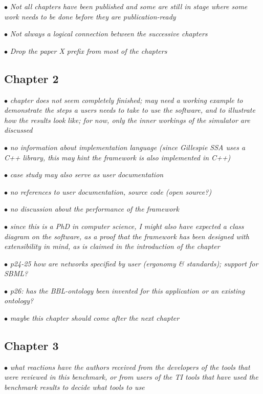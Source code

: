 \documentclass[10pt]{article}
\newcommand{\exam}[2][\  ]{\hspace{0pt}\marginpar{\color{red}#1}$\bullet$ \textit{#2}}
\newcommand{\imp}[1]{{\color{red} #1}}
\newcommand{\bigexclaim}{\raisebox{-0.1em}{\BigTriangleUp}\hspace{-0.32em}\llap{\small\textbf{!}}\hspace{0.32em}}
\newcommand{\tagimp}{\bigexclaim}
\newcommand{\tagtime}{{\Large $\hourglass$}}
\begin{document}
{\exam{Not all chapters have been published and some are still in stage where some work needs to be done before they are publication-ready}

\exam{Not always a logical connection between the successive chapters}


\exam{Drop the paper X prefix from most of the chapters}

\subsection{Chapter 2}


\exam[\tagimp \tagtime]{chapter does not seem completely finished; \imp{may need a working example to demonstrate the steps
	a users needs to take to use the software, and to illustrate how the results look like}; for now, only
	the inner workings of the simulator are discussed}

\exam{no information about implementation language
	(since Gillespie SSA uses a C++ library, this may hint the framework is also implemented in C++)}

\exam{case
	study may also serve as user documentation}

\exam{no references to user documentation, source code
	(open source?)}

\exam{no discussion about the performance of the framework}

\exam[\tagtime]{since this is a PhD in
	computer science, I might also have expected a class diagram on the software, as a proof that the
	framework has been designed with extensibility in mind, as is claimed in the introduction of the chapter}

\exam{p24-25 how are networks specified by user (ergonomy \& standards); support for SBML?}

\exam{p26: has the BBL-ontology been invented for this application or an existing ontology?}

\exam{maybe this chapter should come after the next chapter}

\subsection{Chapter 3}

\exam{what reactions have the authors received from the developers of the tools that were reviewed in
	this benchmark, or from users of the TI tools that have used the benchmark results to decide what
	tools to use}

}
\end{document}
